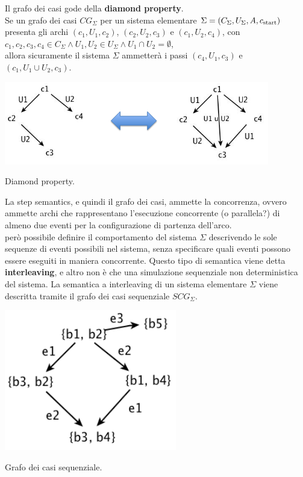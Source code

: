 \begin{property}
    Il grafo dei casi gode della \textbf{diamond property}.\\
    Se un grafo dei casi $CG_{\Sigma}$ per un sistema elementare $\Sigma = (C_{\Sigma}, U_{\Sigma}, A, c_{\textnormal{start}})$ presenta gli archi $(c_1, U_1, c_2)$, $(c_2, U_2, c_3)$ e $(c_1, U_2, c_4)$, con $c_1, c_2, c_3, c_4 \in C_{\Sigma} \land U_1, U_2 \in U_{\Sigma} \land U_1 \cap U_2 = \emptyset$,\\
    allora sicuramente il sistema $\Sigma$ ammetterà i passi $(c_4, U_1, c_3)$ e $(c_1, U_1 \cup U_2, c_3)$.
    \begin{marginfigure}[1cm]
        \includegraphics[width=1.05\linewidth]{img/diamond_property.png}
        \caption{Diamond property.}
        \label{fig:diamond_property}
    \end{marginfigure}
\end{property}
La step semantics, e quindi il grafo dei casi, ammette la concorrenza, ovvero ammette archi che rappresentano l'esecuzione concorrente (o parallela?) di almeno due eventi per la configurazione di partenza dell'arco.\\
\upperAccE però possibile definire il comportamento del sistema $\Sigma$ descrivendo le sole sequenze di eventi possibili nel sistema, senza specificare quali eventi possono essere eseguiti in maniera concorrente. Questo tipo di semantica viene detta \textbf{interleaving}, e altro non è che una simulazione sequenziale non deterministica del sistema. La semantica a interleaving di un sistema elementare $\Sigma$ viene descritta tramite il grafo dei casi sequenziale $SCG_{\Sigma}$.

\begin{marginfigure}
    \includegraphics[width=0.60\linewidth]{img/grafo_casi_sequenziale.png}
    \caption{Grafo dei casi sequenziale.}
    \label{fig:sequential_case_graph}
\end{marginfigure}

